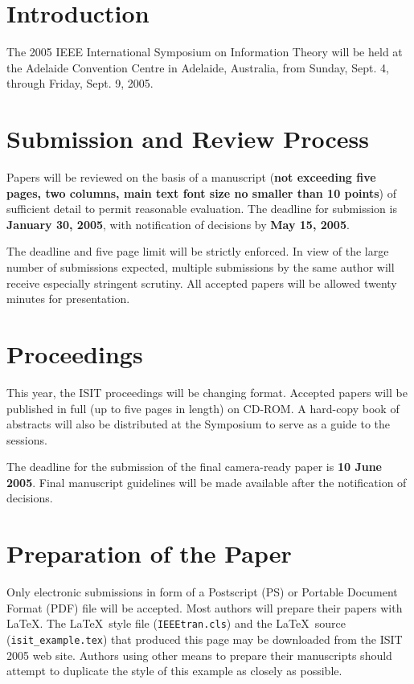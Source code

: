 \documentclass[10pt,conference]{IEEEtran}
\begin{document}
\section{Introduction}
The 2005 IEEE International Symposium on Information Theory will be
held at the Adelaide Convention Centre in Adelaide, Australia, from
Sunday, Sept. 4, through Friday, Sept. 9, 2005.



\section{Submission and Review Process}
Papers will be reviewed on the basis of a manuscript ({\bf not
exceeding five pages, two columns, main text font size no smaller than
10 points}) of sufficient detail to permit reasonable evaluation. The
deadline for submission is {\bf January 30, 2005}, with notification
of decisions by {\bf May 15, 2005}. 

The deadline and five page limit will be strictly
enforced. In view of the large number of submissions expected,
multiple submissions by the same author will receive especially
stringent scrutiny. All accepted papers will be allowed twenty
minutes for presentation.

\section{Proceedings}
This year, the ISIT proceedings will be
changing format. Accepted papers will be published in full (up to
five pages in length) on CD-ROM. A hard-copy book of abstracts will
also be distributed at the Symposium to serve as a guide to the
sessions.  

The deadline for the submission of the final camera-ready
paper is {\bf 10 June 2005}. Final manuscript guidelines will be
made available after the notification of decisions.


\section{Preparation of the Paper}
Only electronic submissions in form of a Postscript (PS) or Portable Document
Format (PDF) file will
be accepted. Most authors will prepare their papers with \LaTeX. The
\LaTeX\ style file (\verb#IEEEtran.cls#) and the \LaTeX\ source
(\verb#isit_example.tex#) that produced this page may be downloaded
from the ISIT 2005 web site. Authors using other means to prepare their manuscripts should attempt to duplicate the style of this example as closely as possible.
\end{document}
